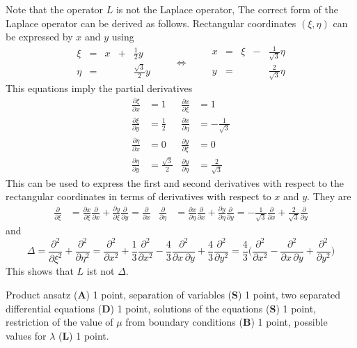 \begin{diskussion}
Note that the operator $L$ is not the Laplace operator,
The correct form of the Laplace operator can be derived as follows.
Rectangular coordinates $(\xi,\eta)$ can be expressed by $x$ and $y$
using
\[
\renewcommand{\arraycolsep}{3pt}
\begin{array}{rcrcr}
\xi  &=& x &+& \frac12 y          \\
\eta &=&   & & \frac{\!\sqrt{3}}2 y
\end{array}
\qquad\Leftrightarrow\qquad
\begin{array}{rcrcr}
x &=& \xi &-& \frac{1}{\!\sqrt{3}} \eta\\
y &=&     & & \frac{2}{\!\sqrt{3}} \eta
\end{array}
\]
This equations imply the partial derivatives
\begin{align*}
\frac{\partial \xi}{\partial x}  &= 1 
&
\frac{\partial x}{\partial \xi}  &= 1
\\
\frac{\partial \xi}{\partial y}  &= \frac12
&
\frac{\partial x}{\partial \eta} &= -\frac{1}{\!\sqrt{3}}
\\
\frac{\partial \eta}{\partial x} &= 0
&
\frac{\partial y}{\partial \xi}  &= 0
\\
\frac{\partial \eta}{\partial y} &= \frac{\!\sqrt{3}}2
&
\frac{\partial y}{\partial \eta} &= \frac{2}{\!\sqrt{3}}
\end{align*}
This can be used to express the first and second derivatives with
respect to the rectangular coordinates in terms of derivatives with
respect to $x$ and $y$.
They are
\begin{align*}
\frac{\partial}{\partial \xi}
&=
\frac{\partial x}{\partial \xi}\frac{\partial}{\partial x}
+
\frac{\partial y}{\partial\xi}\frac{\partial}{\partial y}
=
\frac{\partial}{\partial x}
&
\frac{\partial}{\partial\eta}
&=
\frac{\partial x}{\partial\eta}\frac{\partial}{\partial x}
+
\frac{\partial y}{\partial\eta}\frac{\partial}{\partial y}
=
-\frac{1}{\!\sqrt{3}}\frac{\partial}{\partial x}
+\frac{2}{\!\sqrt{3}}\frac{\partial}{\partial y}
\end{align*}
and
\[
\Delta
=
\frac{\partial^2}{\partial\xi^2}
+
\frac{\partial^2}{\partial\eta^2}
=
\frac{\partial^2}{\partial x^2}
+\frac13\frac{\partial^2}{\partial x^2}
-\frac{4}{3}\frac{\partial^2}{\partial x\,\partial y}
+\frac{4}{3}\frac{\partial^2}{\partial y^2}
=
\frac43\biggl(
\frac{\partial^2}{\partial x^2}
-\frac{\partial^2}{\partial x\,\partial y} + \frac{\partial^2}{\partial y^2}
\biggr)
\]
This shows that $L$ ist not $\Delta$.
\end{diskussion}

\begin{bewertung}
Product ansatz ({\bf A}) 1 point,
separation of variables ({\bf S}) 1 point,
two separated differential equations ({\bf D}) 1 point,
solutions of the equations ({\bf S}) 1 point,
restriction of the value of $\mu$ from boundary conditions ({\bf B}) 1 point,
possible values for $\lambda$ ({\bf L}) 1 point.
\end{bewertung}

